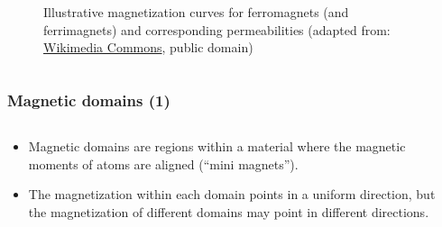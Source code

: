 \begin{frame}
\begin{columns}
\begin{column}{0.425\textwidth}
\begin{figure}
				\caption{Illustrative magnetization curves for ferromagnets (and ferrimagnets) and corresponding permeabilities  (adapted from: \href{https://commons.wikimedia.org/wiki/File:Permeability_of_ferromagnet_by_Zureks.svg}{Wikimedia Commons}, public domain)}
                \label{fig:Permeability_of_ferromagnet}
			\end{figure}
		\end{column}
		\end{columns}
\end{frame}


\begin{frame}
	\frametitle{Magnetic domains (1)}
    \begin{columns}
	\begin{column}{0.48\textwidth}
    \begin{itemize}
        \item Magnetic domains are regions within a material where the magnetic moments of atoms are aligned (``mini magnets'').
        \item The magnetization within each domain points in a uniform direction, but the magnetization of different domains may point in different directions.
    \end{itemize}
    \end{column}
    \hfill
    \begin{column}{0.52\textwidth}
\end{column}
\end{columns}
\end{frame}
